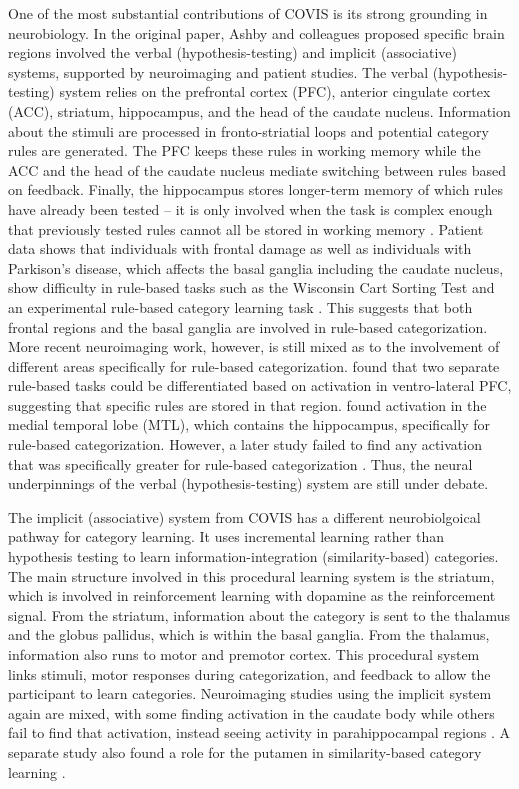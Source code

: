 \documentclass[../dissertation.tex]{subfiles}
\begin{document}
	One of the most substantial contributions of COVIS is its strong grounding in neurobiology. In the original paper, Ashby and colleagues proposed specific brain regions involved the verbal (hypothesis-testing) and implicit (associative) systems, supported by neuroimaging and patient studies. The verbal (hypothesis-testing) system relies on the prefrontal cortex (PFC), anterior cingulate cortex (ACC), striatum, hippocampus, and the head of the caudate nucleus. Information about the stimuli are processed in fronto-striatial loops and potential category rules are generated. The PFC keeps these rules in working memory while the ACC and the head of the caudate nucleus mediate switching between rules based on feedback. Finally, the hippocampus stores longer-term memory of which rules have already been tested – it is only involved when the task is complex enough that previously tested rules cannot all be stored in working memory \citep{Ashby2005,Ashby2011}. Patient data shows that individuals with frontal damage as well as individuals with Parkison's disease, which affects the basal ganglia including the caudate nucleus, show difficulty in rule-based tasks such as the Wisconsin Cart Sorting Test \citep{Robinson1980} and an experimental rule-based category learning task \citep{Ashby2003b}. This suggests that both frontal regions and the basal ganglia are involved in rule-based categorization. More recent neuroimaging work, however, is still mixed as to the involvement of different areas specifically for rule-based categorization. \citet{Soto2013} found that two separate rule-based tasks could be differentiated based on activation in ventro-lateral PFC, suggesting that specific rules are stored in that region. \citet{Nomura2007} found activation in the medial temporal lobe (MTL), which contains the hippocampus, specifically for rule-based categorization. However, a later study failed to find any activation that was specifically greater for rule-based categorization \citep{Carpenter2016}. Thus, the neural underpinnings of the verbal (hypothesis-testing) system are still under debate. \par
	The implicit (associative) system from COVIS has a different neurobiolgoical pathway for category learning. It uses incremental learning rather than hypothesis testing to learn information-integration (similarity-based) categories. The main structure involved in this procedural learning system is the striatum, which is involved in reinforcement learning with dopamine as the reinforcement signal. From the striatum, information about the category is sent to the thalamus and the globus pallidus, which is within the basal ganglia. From the thalamus, information also runs to motor and premotor cortex. This procedural system links stimuli, motor responses during categorization, and feedback to allow the participant to learn categories. Neuroimaging studies using the implicit system again are mixed, with some finding activation in the caudate body while others fail to find that activation, instead seeing activity in parahippocampal regions \citep{Nomura2007,Carpenter2016}. A separate study also found a role for the putamen in similarity-based category learning \citep{Waldschmidt2011}. \par
\end{document}
